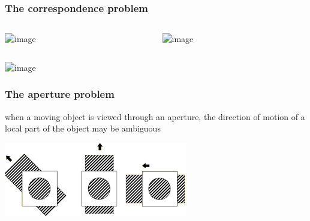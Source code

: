 \documentclass[]{beamer}
\begin{document}
\begin{frame}
 \frametitle{The correspondence problem}
\begin{overlayarea}{110mm}{80mm}
 \begin{columns}[T]
 \begin{column}{40mm}
\includegraphics<1->[width=35mm]{figs/l7/correspondence_1.png}
 \end{column}

 \begin{column}{40mm}
\includegraphics<1->[width=35mm]{figs/l7/correspondence_2.png} 
\end{column}
\end{columns}

\begin{center}
\includegraphics<2>[width=40mm]{figs/l7/correspondence_3.png} 
\end{center}
\end{overlayarea}
\end{frame}

\begin{frame}
 \frametitle{The aperture problem}
\begin{overlayarea}{120mm}{70mm}
when a moving object is viewed through an aperture, the direction of motion of a local part of the object may be ambiguous 
\begin{center}
\includegraphics[width=80mm]{figs/l7/aperture.png} 
\end{center}

\end{overlayarea}
\end{frame}
\end{document}
